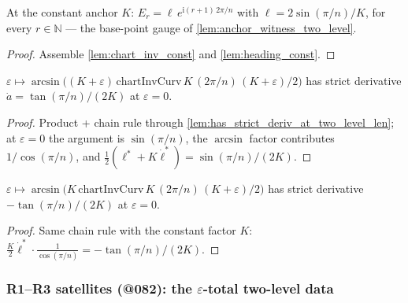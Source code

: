 \begin{lemma}
  \label{lem:jacobian_edge_const}
  At the constant anchor $K$:
  $E_r = \ell\, e^{\mathrm{i}(r+1)\,2\pi/n}$ with $\ell = 2\sin(\pi/n)/K$,
  for every $r \in \mathbb{N}$ --- the base-point gauge of
  \cref{lem:anchor_witness_two_level}.
\end{lemma}
\begin{proof}

\leanok
  Assemble \cref{lem:chart_inv_const} and \cref{lem:heading_const}.
\end{proof}

\begin{lemma}
  \label{lem:has_strict_deriv_at_bump_slot}
  $\varepsilon \mapsto \arcsin\bigl((K+\varepsilon)\,
  \mathrm{chartInvCurv}\,K\,(2\pi/n)\,(K+\varepsilon)/2\bigr)$ has strict
  derivative $\dot a = \tan(\pi/n)/(2K)$ at $\varepsilon = 0$.
\end{lemma}
\begin{proof}

\leanok
  Product + chain rule through \cref{lem:has_strict_deriv_at_two_level_len};
  at $\varepsilon = 0$ the argument is $\sin(\pi/n)$, the $\arcsin$ factor
  contributes $1/\cos(\pi/n)$, and
  $\tfrac12(\ell^* + K\dot\ell^*) = \sin(\pi/n)/(2K)$.
\end{proof}

\begin{lemma}
  \label{lem:has_strict_deriv_at_mixed_slot}
  $\varepsilon \mapsto \arcsin\bigl(K\,
  \mathrm{chartInvCurv}\,K\,(2\pi/n)\,(K+\varepsilon)/2\bigr)$ has strict
  derivative $-\tan(\pi/n)/(2K)$ at $\varepsilon = 0$.
\end{lemma}
\begin{proof}

\leanok
  Same chain rule with the constant factor $K$:
  $\tfrac{K}{2}\dot\ell^*\cdot\tfrac1{\cos(\pi/n)} = -\tan(\pi/n)/(2K)$.
\end{proof}

\subsubsection*{R1--R3 satellites (@082): the $\varepsilon$-total two-level data}

